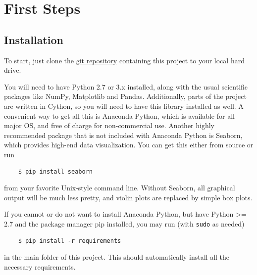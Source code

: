 \documentclass[
12pt, %
a4paper, %
headinclude,footinclude %
]{article}
\makeatletter
\newcommand{\verbatimfont}[1]{\renewcommand{\verbatim@font}{\ttfamily#1}}
\makeatother
\begin{document}
\verbatimfont{\footnotesize}
\title{\rmfamily\normalfont{}}
\author{}
\date{\today}

\maketitle

\tableofcontents
\clearpage
\newcommand{\sectionbreak}{\clearpage}
\pagestyle{plain}
\section{First Steps}
\subsection{Installation}
To start, just clone the \href{https://github.com/dionhaefner/cces-sem-botero}{git repository} containing this project to your local hard drive.

You will need to have Python 2.7 or 3.x installed, along with the usual scientific packages like NumPy, Matplotlib and Pandas. Additionally, parts of the project are written in Cython, so you will need to have this library installed as well. A convenient way to get all this is Anaconda Python, which is available for all major OS, and free of charge for non-commercial use. Another highly recommended package that is not included with Anaconda Python is Seaborn, which provides high-end data visualization. You can get this either from source or run

\begin{verbatim}
    $ pip install seaborn
\end{verbatim}

\noindent from your favorite Unix-style command line. Without Seaborn, all graphical output will be much less pretty, and violin plots are replaced by simple box plots.

If you cannot or do not want to install Anaconda Python, but have Python >= 2.7 and the package manager pip installed, you may run (with \verb|sudo| as needed)

\begin{verbatim}
    $ pip install -r requirements
\end{verbatim}

\noindent in the main folder of this project. This should automatically install all the necessary requirements.
\end{document}
